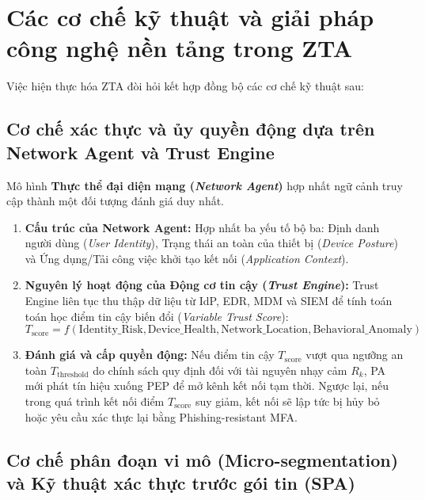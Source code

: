 \section{Các cơ chế kỹ thuật và giải pháp công nghệ nền tảng trong ZTA}
\label{sec:2_3}

Việc hiện thực hóa ZTA đòi hỏi kết hợp đồng bộ các cơ chế kỹ thuật sau:

\subsection{Cơ chế xác thực và ủy quyền động dựa trên Network Agent và Trust Engine}
\label{subsec:2_3_1}

Mô hình \textbf{Thực thể đại diện mạng (\textit{Network Agent})} hợp nhất ngữ cảnh truy cập thành một đối tượng đánh giá duy nhất.

\begin{enumerate}
    \item \textbf{Cấu trúc của Network Agent:} Hợp nhất ba yếu tố bộ ba: Định danh người dùng (\textit{User Identity}), Trạng thái an toàn của thiết bị (\textit{Device Posture}) và Ứng dụng/Tải công việc khởi tạo kết nối (\textit{Application Context}).
    \item \textbf{Nguyên lý hoạt động của Động cơ tin cậy (\textit{Trust Engine}):} Trust Engine liên tục thu thập dữ liệu từ IdP, EDR, MDM và SIEM để tính toán toán học điểm tin cậy biến đổi (\textit{Variable Trust Score}):
    \begin{equation}
        T_{\text{score}} = f(\text{Identity\_Risk}, \text{Device\_Health}, \text{Network\_Location}, \text{Behavioral\_Anomaly})
    \end{equation}
    \item \textbf{Đánh giá và cấp quyền động:} Nếu điểm tin cậy $T_{\text{score}}$ vượt qua ngưỡng an toàn $T_{\text{threshold}}$ do chính sách quy định đối với tài nguyên nhạy cảm $R_k$, PA mới phát tín hiệu xuống PEP để mở kênh kết nối tạm thời. Ngược lại, nếu trong quá trình kết nối điểm $T_{\text{score}}$ suy giảm, kết nối sẽ lập tức bị hủy bỏ hoặc yêu cầu xác thực lại bằng Phishing-resistant MFA.
\end{enumerate}

\subsection{Cơ chế phân đoạn vi mô (Micro-segmentation) và Kỹ thuật xác thực trước gói tin (SPA)}
\label{subsec:2_3_2}

